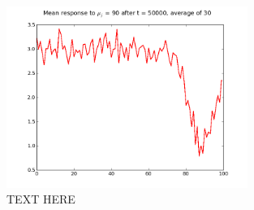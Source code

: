 \begin{figure}[h]
\centering
\includegraphics[width=0.7\textwidth]{../ex2/weights_mu90_t50k_mean.png}
\caption{TEXT HERE}
\label{fig:mu90}
\end{figure}
